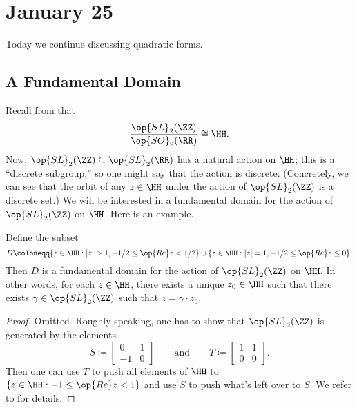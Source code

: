\documentclass[../notes.tex]{subfiles}
\begin{document}
\section{January 25}

Today we continue discussing quadratic forms.

\subsection{A Fundamental Domain}
Recall from  that
\[\frac{\op{SL}_2(\ZZ)}{\op{SO}_2(\RR)}\cong\HH.\]
Now, $\op{SL}_2(\ZZ)\subseteq\op{SL}_2(\RR)$ has a natural action on $\HH$; this is a ``discrete subgroup,'' so one might say that the action is discrete. (Concretely, we can see that the orbit of any $z\in\HH$ under the action of $\op{SL}_2(\ZZ)$ is a discrete set.) We will be interested in a fundamental domain for the action of $\op{SL}_2(\ZZ)$ on $\HH$. Here is an example.
\begin{proposition} \label{prop:fund-domain}
	Define the subset
	\[D\coloneqq\{z\in\HH:|z|>1,-1/2\le\op{Re}z<1/2\}\cup\{z\in\HH:|z|=1,-1/2\le\op{Re}z\le0\}.\]
	Then $D$ is a fundamental domain for the action of $\op{SL}_2(\ZZ)$ on $\HH$. In other words, for each $z\in\HH$, there exists a unique $z_0\in\HH$ such that there exists $\gamma\in\op{SL}_2(\ZZ)$ such that $z=\gamma\cdot z_0$.
\end{proposition}
\begin{proof}
	Omitted. Roughly speaking, one has to show that $\op{SL}_2(\ZZ)$ is generated by the elements
	\[S\coloneqq\begin{bmatrix}
		0 & 1 \\
		-1 & 0
	\end{bmatrix}\qquad\text{and}\qquad T\coloneqq\begin{bmatrix}
		1 & 1 \\
		0 & 0
	\end{bmatrix}.\]
	Then one can use $T$ to push all elements of $\HH$ to $\{z\in\HH:-1\le\op{Re}z<1\}$ and use $S$ to push what's left over to $S$. We refer to \cite{course-arithmetic} for details.
\end{proof}
\end{document}
